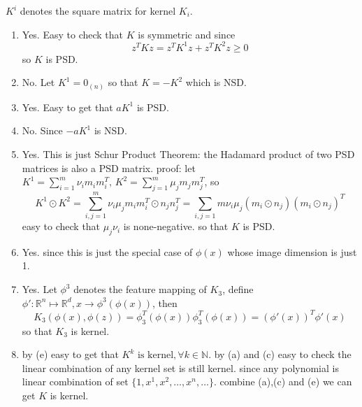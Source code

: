 \begin{answer}
	$ K^i $ denotes the square matrix for kernel $ K_i $.
\begin{enumerate}
	\item Yes. Easy to check that $ K $ is symmetric and since\[ z^TKz = z^TK^1z + z^TK^2z \geq 0\] so $ K $ is PSD.
	\item No. Let $ K^1 = 0_{(n)}$ so that $ K = -K^2 $ which is NSD.
	\item Yes. Easy to get that $ aK^1 $ is PSD.
	\item No. Since $ -aK^1 $ is NSD.
	\item Yes. This is just Schur Product Theorem: the Hadamard product of two PSD matrices is also a PSD matrix.
	proof: let $ K^1 = \sum_{i=1}^{m} \nu_im_im_i^T,\, K^2 = \sum_{j=1}^{m} \mu_jm_jm_j^T$, so \[ K^1\odot K^2 = \sum_{i,j=1}^{m} \nu_i\mu_j m_im_i^T\odot n_jn_j^T = \sum_{i,j=1}{m}\nu_i\mu_j(m_i\odot n_j)(m_i\odot n_j)^T \]
	easy to check that $ \mu_j\nu_i $ is none-negative. so that $ K $ is PSD.
	\item Yes. since this is just the special case of $\phi(x) $ whose image dimension is just 1.
	\item Yes. Let $ \phi^3 $ denotes the feature mapping of $ K_3 $, define $ \phi':\mathbb{R}^n\mapsto \mathbb{R}^d, x \to \phi^3(\phi(x)) $, then
	\[ K_3(\phi(x),\phi(z)) = \phi_3^T(\phi(x))\phi_3^T(\phi(x)) = (\phi'(x))^T\phi'(x)\]
	so that $ K_3 $ is kernel.
	\item by (e) easy to get that $ K^k \text{ is kernel}, \forall k \in \mathbb{N} $. by (a) and (c) easy to check the linear combination of any kernel set is still kernel. since any polynomial is linear combination of set $ \{1,x^1,x^2,\ldots,x^n,\ldots\}$. combine (a),(c) and (e) we can get $ K $ is kernel.
\end{enumerate}
\end{answer}
